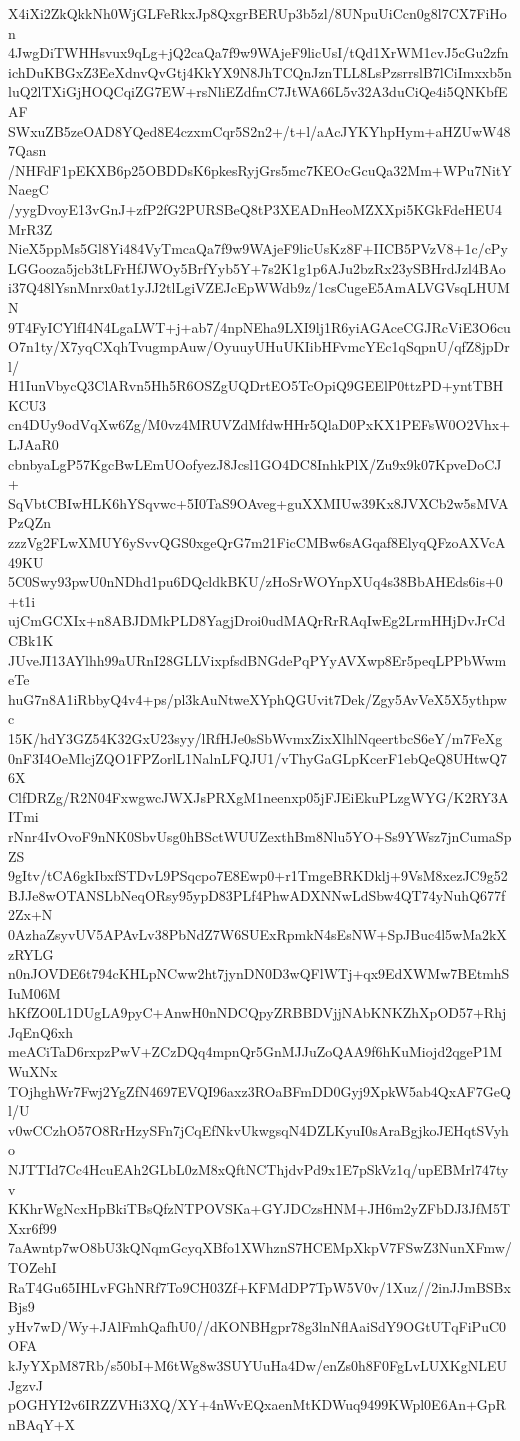 X4iXi2ZkQkkNh0WjGLFeRkxJp8QxgrBERUp3b5zl/8UNpuUiCcn0g8l7CX7FiHon
4JwgDiTWHHsvux9qLg+jQ2caQa7f9w9WAjeF9licUsI/tQd1XrWM1cvJ5cGu2zfn
ichDuKBGxZ3EeXdnvQvGtj4KkYX9N8JhTCQnJznTLL8LsPzsrrslB7lCiImxxb5n
luQ2lTXiGjHOQCqiZG7EW+rsNliEZdfmC7JtWA66L5v32A3duCiQe4i5QNKbfEAF
SWxuZB5zeOAD8YQed8E4czxmCqr5S2n2+/t+l/aAcJYKYhpHym+aHZUwW487Qasn
/NHFdF1pEKXB6p25OBDDsK6pkesRyjGrs5mc7KEOcGcuQa32Mm+WPu7NitYNaegC
/yygDvoyE13vGnJ+zfP2fG2PURSBeQ8tP3XEADnHeoMZXXpi5KGkFdeHEU4MrR3Z
NieX5ppMs5Gl8Yi484VyTmcaQa7f9w9WAjeF9licUsKz8F+IICB5PVzV8+1c/cPy
LGGooza5jcb3tLFrHfJWOy5BrfYyb5Y+7s2K1g1p6AJu2bzRx23ySBHrdJzl4BAo
i37Q48lYsnMnrx0at1yJJ2tlLgiVZEJcEpWWdb9z/1csCugeE5AmALVGVsqLHUMN
9T4FyICYlfI4N4LgaLWT+j+ab7/4npNEha9LXI9lj1R6yiAGAceCGJRcViE3O6cu
O7n1ty/X7yqCXqhTvugmpAuw/OyuuyUHuUKIibHFvmcYEc1qSqpnU/qfZ8jpDrl/
H1IunVbycQ3ClARvn5Hh5R6OSZgUQDrtEO5TcOpiQ9GEElP0ttzPD+yntTBHKCU3
cn4DUy9odVqXw6Zg/M0vz4MRUVZdMfdwHHr5QlaD0PxKX1PEFsW0O2Vhx+LJAaR0
cbnbyaLgP57KgcBwLEmUOofyezJ8Jcsl1GO4DC8InhkPlX/Zu9x9k07KpveDoCJ+
SqVbtCBIwHLK6hYSqvwc+5I0TaS9OAveg+guXXMIUw39Kx8JVXCb2w5sMVAPzQZn
zzzVg2FLwXMUY6ySvvQGS0xgeQrG7m21FicCMBw6sAGqaf8ElyqQFzoAXVcA49KU
5C0Swy93pwU0nNDhd1pu6DQcldkBKU/zHoSrWOYnpXUq4s38BbAHEds6is+0+t1i
ujCmGCXIx+n8ABJDMkPLD8YagjDroi0udMAQrRrRAqIwEg2LrmHHjDvJrCdCBk1K
JUveJI13AYlhh99aURnI28GLLVixpfsdBNGdePqPYyAVXwp8Er5peqLPPbWwmeTe
huG7n8A1iRbbyQ4v4+ps/pl3kAuNtweXYphQGUvit7Dek/Zgy5AvVeX5X5ythpwc
15K/hdY3GZ54K32GxU23syy/lRfHJe0sSbWvmxZixXlhlNqeertbcS6eY/m7FeXg
0nF3I4OeMlcjZQO1FPZorlL1NalnLFQJU1/vThyGaGLpKcerF1ebQeQ8UHtwQ76X
ClfDRZg/R2N04FxwgwcJWXJsPRXgM1neenxp05jFJEiEkuPLzgWYG/K2RY3AITmi
rNnr4IvOvoF9nNK0SbvUsg0hBSctWUUZexthBm8Nlu5YO+Ss9YWsz7jnCumaSpZS
9gItv/tCA6gkIbxfSTDvL9PSqcpo7E8Ewp0+r1TmgeBRKDklj+9VsM8xezJC9g52
BJJe8wOTANSLbNeqORsy95ypD83PLf4PhwADXNNwLdSbw4QT74yNuhQ677f2Zx+N
0AzhaZsyvUV5APAvLv38PbNdZ7W6SUExRpmkN4sEsNW+SpJBuc4l5wMa2kXzRYLG
n0nJOVDE6t794cKHLpNCww2ht7jynDN0D3wQFlWTj+qx9EdXWMw7BEtmhSIuM06M
hKfZO0L1DUgLA9pyC+AnwH0nNDCQpyZRBBDVjjNAbKNKZhXpOD57+RhjJqEnQ6xh
meACiTaD6rxpzPwV+ZCzDQq4mpnQr5GnMJJuZoQAA9f6hKuMiojd2qgeP1MWuXNx
TOjhghWr7Fwj2YgZfN4697EVQI96axz3ROaBFmDD0Gyj9XpkW5ab4QxAF7GeQl/U
v0wCCzhO57O8RrHzySFn7jCqEfNkvUkwgsqN4DZLKyuI0sAraBgjkoJEHqtSVyho
NJTTId7Cc4HcuEAh2GLbL0zM8xQftNCThjdvPd9x1E7pSkVz1q/upEBMrl747tyv
KKhrWgNcxHpBkiTBsQfzNTPOVSKa+GYJDCzsHNM+JH6m2yZFbDJ3JfM5TXxr6f99
7aAwntp7wO8bU3kQNqmGcyqXBfo1XWhznS7HCEMpXkpV7FSwZ3NunXFmw/TOZehI
RaT4Gu65IHLvFGhNRf7To9CH03Zf+KFMdDP7TpW5V0v/1Xuz//2inJJmBSBxBjs9
yHv7wD/Wy+JAlFmhQafhU0//dKONBHgpr78g3lnNflAaiSdY9OGtUTqFiPuC0OFA
kJyYXpM87Rb/s50bI+M6tWg8w3SUYUuHa4Dw/enZs0h8F0FgLvLUXKgNLEUJgzvJ
pOGHYI2v6IRZZVHi3XQ/XY+4nWvEQxaenMtKDWuq9499KWpl0E6An+GpRnBAqY+X
